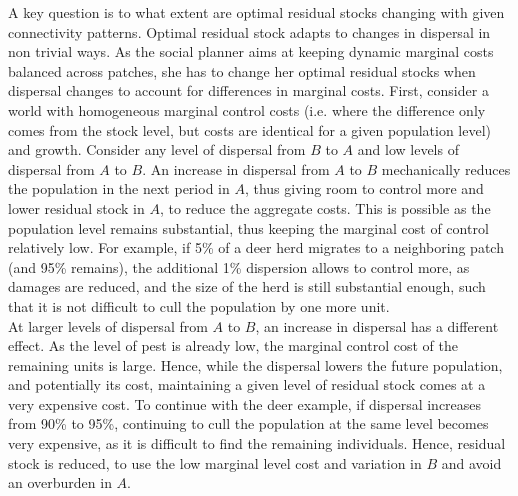 A key question is to what extent are optimal residual stocks changing with given connectivity patterns. Optimal residual stock adapts to changes in dispersal in non trivial ways. As the social planner aims at keeping dynamic marginal costs balanced across patches, she has to change her optimal residual stocks when dispersal changes to account for differences in marginal costs. 
First, consider a world with homogeneous marginal control costs (i.e. where the difference only comes from the stock level, but costs are identical for a given population level) and growth. Consider any level of dispersal from $B$ to $A$ and low levels of dispersal from $A$ to $B$.  An increase in dispersal from $A$ to $B$ mechanically reduces the population in the next period in $A$, thus giving room to control more and lower residual stock in $A$, to reduce the aggregate costs. This is possible as the population level remains substantial, thus keeping the marginal cost of control relatively low. For example, if 5\% of a deer herd migrates to a neighboring patch (and 95\% remains), the additional 1\% dispersion allows to control more, as damages are reduced, and the size of the herd is still substantial enough, such that it is not difficult to cull the population by one more unit. 
\\
At larger levels of dispersal from $A$ to $B$, an increase in dispersal has a different effect. As the level of pest is already low, the marginal control cost of the remaining units is large. Hence, while the dispersal lowers the future population, and potentially its cost, maintaining a given level of residual stock comes at a very expensive cost. To continue with the deer example, if dispersal increases from 90\% to 95\%, continuing to cull the population at the same level becomes very expensive, as it is difficult to find the remaining individuals. Hence, residual stock is reduced, to use the low marginal level cost and variation in $B$ and avoid an overburden in $A$.\\

